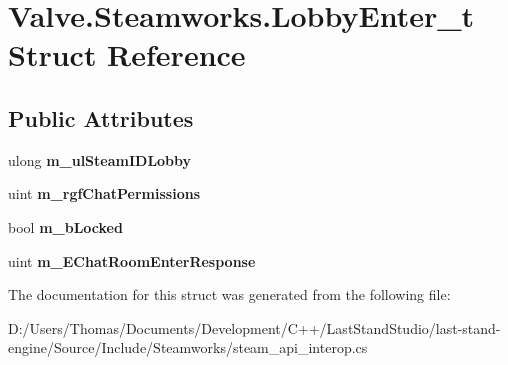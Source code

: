 \hypertarget{structValve_1_1Steamworks_1_1LobbyEnter__t}{}\section{Valve.\+Steamworks.\+Lobby\+Enter\+\_\+t Struct Reference}
\label{structValve_1_1Steamworks_1_1LobbyEnter__t}
\subsection*{Public Attributes}
\begin{DoxyCompactItemize}
\item 
\hypertarget{structValve_1_1Steamworks_1_1LobbyEnter__t_a73106b265181ab19c61ab6e9607ce51f}{}ulong {\bfseries m\+\_\+ul\+Steam\+I\+D\+Lobby}\label{structValve_1_1Steamworks_1_1LobbyEnter__t_a73106b265181ab19c61ab6e9607ce51f}

\item 
\hypertarget{structValve_1_1Steamworks_1_1LobbyEnter__t_a598c68b084c439a075a259d62105b024}{}uint {\bfseries m\+\_\+rgf\+Chat\+Permissions}\label{structValve_1_1Steamworks_1_1LobbyEnter__t_a598c68b084c439a075a259d62105b024}

\item 
\hypertarget{structValve_1_1Steamworks_1_1LobbyEnter__t_a5eff994355b5449a3c9de9f049b817e2}{}bool {\bfseries m\+\_\+b\+Locked}\label{structValve_1_1Steamworks_1_1LobbyEnter__t_a5eff994355b5449a3c9de9f049b817e2}

\item 
\hypertarget{structValve_1_1Steamworks_1_1LobbyEnter__t_a9d73bce07c462fe61d8e09cad3a922c6}{}uint {\bfseries m\+\_\+\+E\+Chat\+Room\+Enter\+Response}\label{structValve_1_1Steamworks_1_1LobbyEnter__t_a9d73bce07c462fe61d8e09cad3a922c6}

\end{DoxyCompactItemize}


The documentation for this struct was generated from the following file\+:\begin{DoxyCompactItemize}
\item 
D\+:/\+Users/\+Thomas/\+Documents/\+Development/\+C++/\+Last\+Stand\+Studio/last-\/stand-\/engine/\+Source/\+Include/\+Steamworks/steam\+\_\+api\+\_\+interop.\+cs\end{DoxyCompactItemize}
